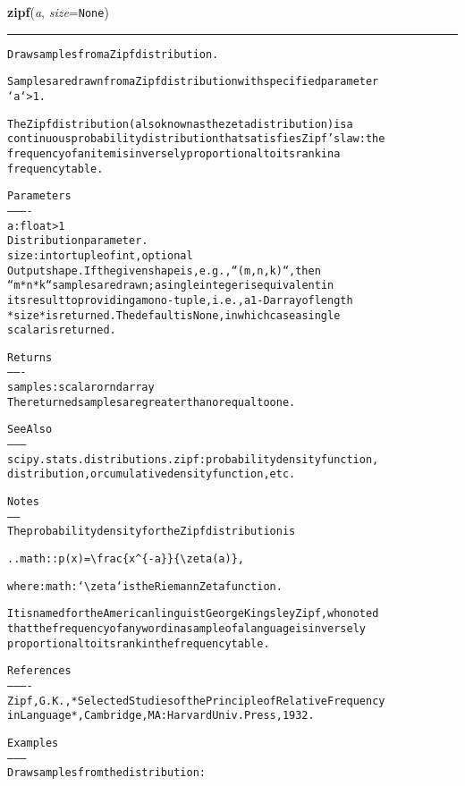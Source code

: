 \hspace{.8\funcindent}\begin{boxedminipage}{\funcwidth}

    \raggedright \textbf{zipf}(\textit{a}, \textit{size}={\tt None})

    \vspace{-1.5ex}

    \rule{\textwidth}{0.5\fboxrule}
\setlength{\parskip}{2ex}
\begin{alltt}
Draw samples from a Zipf distribution.

Samples are drawn from a Zipf distribution with specified parameter
`a` {\textgreater} 1.

The Zipf distribution (also known as the zeta distribution) is a
continuous probability distribution that satisfies Zipf's law: the
frequency of an item is inversely proportional to its rank in a
frequency table.

Parameters
----------
a : float {\textgreater} 1
    Distribution parameter.
size : int or tuple of int, optional
    Output shape.  If the given shape is, e.g., ``(m, n, k)``, then
    ``m * n * k`` samples are drawn; a single integer is equivalent in
    its result to providing a mono-tuple, i.e., a 1-D array of length
    *size* is returned.  The default is None, in which case a single
    scalar is returned.

Returns
-------
samples : scalar or ndarray
    The returned samples are greater than or equal to one.

See Also
--------
scipy.stats.distributions.zipf : probability density function,
    distribution, or cumulative density function, etc.

Notes
-----
The probability density for the Zipf distribution is

.. math:: p(x) = {\textbackslash}frac\{x{\textasciicircum}\{-a\}\}\{{\textbackslash}zeta(a)\},

where :math:`{\textbackslash}zeta` is the Riemann Zeta function.

It is named for the American linguist George Kingsley Zipf, who noted
that the frequency of any word in a sample of a language is inversely
proportional to its rank in the frequency table.

References
----------
Zipf, G. K., *Selected Studies of the Principle of Relative Frequency
in Language*, Cambridge, MA: Harvard Univ. Press, 1932.

Examples
--------
Draw samples from the distribution:


\end{alltt}
\end{boxedminipage}
